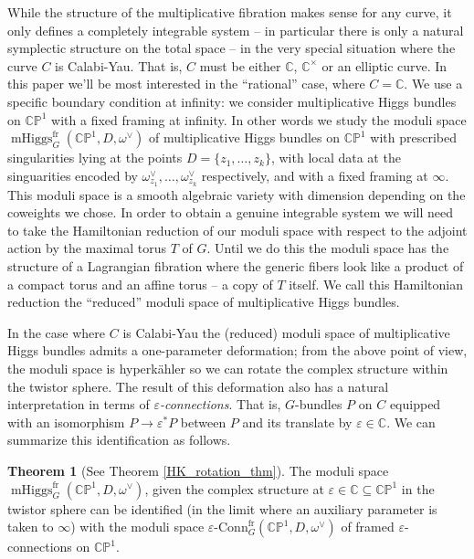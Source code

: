 \documentclass[11pt, oneside, reqno]{amsart}
\theoremstyle{definition} \newtheorem{definition}{Definition}[section]
\newtheorem{theorem}[definition]{Theorem}
\theoremstyle{definition} \newtheorem{remark}[definition]{Remark}
\theoremstyle{definition} \newtheorem{remarks}[definition]{Remarks}
\theoremstyle{definition} \newtheorem{question}[definition]{Question}
\theoremstyle{definition} \newtheorem*{note}{Note}
\theoremstyle{definition} \newtheorem{example}[definition]{Example}
\theoremstyle{definition} \newtheorem{examples}[definition]{Examples}
\newcommand{\bb}[1]{\mathbb{#1}}
\newcommand{\CC}{\mathbb{C}}
\newcommand{\eps}{\varepsilon}
\newcommand{\sub}{\subseteq}
\DeclareMathOperator{\mhiggs}{mHiggs}
\newcommand{\epsconn}{\varepsilon\text{-Conn}}
\begin{document}
 While the structure of the multiplicative fibration makes sense for any curve, it only defines a completely integrable system -- in particular there is only a natural symplectic structure on the total space -- in the very special situation where the curve $C$ is Calabi-Yau.  That is, $C$ must be either $\CC$, $\CC^\times$ or an elliptic curve.  In this paper we'll be most interested in the ``rational'' case, where $C = \CC$.  We use a specific boundary condition at infinity: we consider multiplicative Higgs bundles on $\bb{CP}^1$ with a fixed framing at infinity.  In other words we study the moduli space $\mhiggs^{\text{fr}}_G(\bb{CP}^1,D,\omega^\vee)$ of multiplicative Higgs bundles on $\bb{CP}^1$ with prescribed singularities lying at the points $D = \{z_1, \ldots, z_k\}$, with local data at the singuarities encoded by $\omega_{z_1}^\vee, \ldots, \omega_{z_k}^\vee$ respectively, and with a fixed framing at $\infty$.  This moduli space is a smooth algebraic variety with dimension depending on the coweights we chose.  In order to obtain a genuine integrable system we will need to take the Hamiltonian reduction of our moduli space with respect to the adjoint action by the maximal torus $T$ of $G$.  Until we do this the moduli space has the structure of a Lagrangian fibration where the generic fibers look like a product of a compact torus and an affine torus -- a copy of $T$ itself.  We call this Hamiltonian reduction the ``reduced'' moduli space of multiplicative Higgs bundles.
 
 In the case where $C$ is Calabi-Yau the (reduced) moduli space of multiplicative Higgs bundles admits a one-parameter deformation; from the above point of view, the moduli space is hyperk\"ahler so we can rotate the complex structure within the twistor sphere.  The result of this deformation also has a natural interpretation in terms of \emph{$\eps$-connections}.  That is, $G$-bundles $P$ on $C$ equipped with an isomorphism $P \to \eps^*P$ between $P$ and its translate by $\eps \in \CC$.  We can summarize this identification as follows.
 
 \begin{theorem} [See Theorem \ref{HK_rotation_thm}]
 The moduli space $\mhiggs^{\text{fr}}_G(\bb{CP}^1,D,\omega^\vee)$, given the complex structure at $\eps \in \CC \sub \bb{CP}^1$ in the twistor sphere can be identified (in the limit where an auxiliary parameter is taken to $\infty$) with the moduli space $\epsconn^{\text{fr}}_G(\bb{CP}^1,D,\omega^\vee)$ of framed $\eps$-connections on $\bb{CP}^1$.
 \end{theorem}
\end{document}
